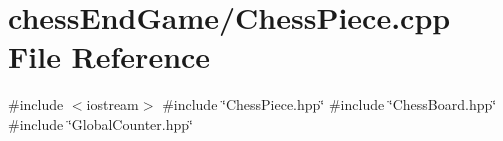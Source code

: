 \section{chess\+End\+Game/\+Chess\+Piece.cpp File Reference}
\label{_chess_piece_8cpp}
{\ttfamily \#include $<$iostream$>$}\newline
{\ttfamily \#include \char`\"{}Chess\+Piece.\+hpp\char`\"{}}\newline
{\ttfamily \#include \char`\"{}Chess\+Board.\+hpp\char`\"{}}\newline
{\ttfamily \#include \char`\"{}Global\+Counter.\+hpp\char`\"{}}\newline
